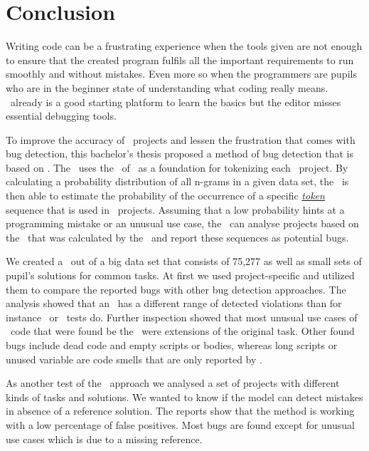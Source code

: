 \chapter{Conclusion}\label{chap:conclusion}

Writing code can be a frustrating experience when the tools given are not enough to ensure that the created program fulfils all the important requirements to run smoothly and without mistakes. Even more so when the programmers are pupils who are in the beginner state of understanding what coding really means. \scratch\ already is a good starting platform to learn the basics but the editor misses essential debugging tools.

To improve the accuracy of \scratch\ projects and lessen the frustration that comes with bug detection, this bachelor's thesis proposed a method of bug detection that is based on . The \tokenizer\ uses the \AST\ of \litterbox\ as a foundation for tokenizing each \scratch\ project. By calculating a probability distribution of all n-grams in a given data set, the \ngramtrainer\ is then able to estimate the probability of the occurrence of a specific \hyperref[def:token]{\textit{token}} sequence that is used in \scratch\ projects. Assuming that a low probability hints at a programming mistake or an unusual use case, the \ngrambugfinder\ can analyse projects based on the \ngram\ that was calculated by the \ngramtrainer\ and report these sequences as potential bugs.

We created a \ngram\ out of a big data set that consists of 75,277 as well as small sets of pupil's solutions for common tasks. At first we used project-specific  and utilized them to compare the reported bugs with other bug detection approaches. The analysis showed that an \ngram\ has a different range of detected violations than for instance \litterbox\ or \whisker\ tests do. Further inspection showed that most unusual use cases of \scratch\ code that were found be the \ngram\ were extensions of the original task. Other found bugs include dead code and empty scripts or bodies, whereas long scripts or unused variable are code smells that are only reported by \litterbox{}. 

As another test of the \ngram\ approach we analysed a set of projects with different kinds of tasks and solutions. We wanted to know if the model can detect mistakes in absence of a reference solution. The reports show that the method is working with a low percentage of false positives. Most bugs are found except for unusual use cases which is due to a missing reference.

